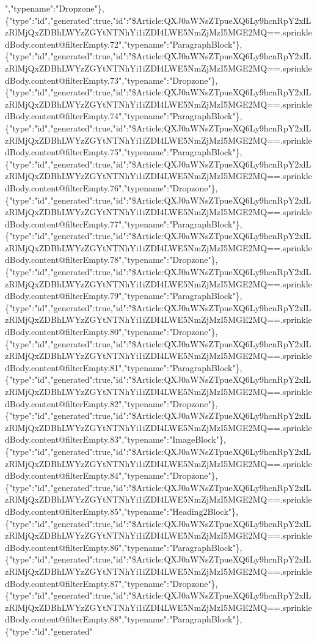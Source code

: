 ","typename":"Dropzone"\},\{"type":"id","generated":true,"id":"\$Article:QXJ0aWNsZTpueXQ6Ly9hcnRpY2xlLzRlMjQxZDBhLWYzZGYtNTNhYi1iZDI4LWE5NmZjMzI5MGE2MQ==.sprinkledBody.content@filterEmpty.72","typename":"ParagraphBlock"\},\{"type":"id","generated":true,"id":"\$Article:QXJ0aWNsZTpueXQ6Ly9hcnRpY2xlLzRlMjQxZDBhLWYzZGYtNTNhYi1iZDI4LWE5NmZjMzI5MGE2MQ==.sprinkledBody.content@filterEmpty.73","typename":"Dropzone"\},\{"type":"id","generated":true,"id":"\$Article:QXJ0aWNsZTpueXQ6Ly9hcnRpY2xlLzRlMjQxZDBhLWYzZGYtNTNhYi1iZDI4LWE5NmZjMzI5MGE2MQ==.sprinkledBody.content@filterEmpty.74","typename":"ParagraphBlock"\},\{"type":"id","generated":true,"id":"\$Article:QXJ0aWNsZTpueXQ6Ly9hcnRpY2xlLzRlMjQxZDBhLWYzZGYtNTNhYi1iZDI4LWE5NmZjMzI5MGE2MQ==.sprinkledBody.content@filterEmpty.75","typename":"ParagraphBlock"\},\{"type":"id","generated":true,"id":"\$Article:QXJ0aWNsZTpueXQ6Ly9hcnRpY2xlLzRlMjQxZDBhLWYzZGYtNTNhYi1iZDI4LWE5NmZjMzI5MGE2MQ==.sprinkledBody.content@filterEmpty.76","typename":"Dropzone"\},\{"type":"id","generated":true,"id":"\$Article:QXJ0aWNsZTpueXQ6Ly9hcnRpY2xlLzRlMjQxZDBhLWYzZGYtNTNhYi1iZDI4LWE5NmZjMzI5MGE2MQ==.sprinkledBody.content@filterEmpty.77","typename":"ParagraphBlock"\},\{"type":"id","generated":true,"id":"\$Article:QXJ0aWNsZTpueXQ6Ly9hcnRpY2xlLzRlMjQxZDBhLWYzZGYtNTNhYi1iZDI4LWE5NmZjMzI5MGE2MQ==.sprinkledBody.content@filterEmpty.78","typename":"Dropzone"\},\{"type":"id","generated":true,"id":"\$Article:QXJ0aWNsZTpueXQ6Ly9hcnRpY2xlLzRlMjQxZDBhLWYzZGYtNTNhYi1iZDI4LWE5NmZjMzI5MGE2MQ==.sprinkledBody.content@filterEmpty.79","typename":"ParagraphBlock"\},\{"type":"id","generated":true,"id":"\$Article:QXJ0aWNsZTpueXQ6Ly9hcnRpY2xlLzRlMjQxZDBhLWYzZGYtNTNhYi1iZDI4LWE5NmZjMzI5MGE2MQ==.sprinkledBody.content@filterEmpty.80","typename":"Dropzone"\},\{"type":"id","generated":true,"id":"\$Article:QXJ0aWNsZTpueXQ6Ly9hcnRpY2xlLzRlMjQxZDBhLWYzZGYtNTNhYi1iZDI4LWE5NmZjMzI5MGE2MQ==.sprinkledBody.content@filterEmpty.81","typename":"ParagraphBlock"\},\{"type":"id","generated":true,"id":"\$Article:QXJ0aWNsZTpueXQ6Ly9hcnRpY2xlLzRlMjQxZDBhLWYzZGYtNTNhYi1iZDI4LWE5NmZjMzI5MGE2MQ==.sprinkledBody.content@filterEmpty.82","typename":"Dropzone"\},\{"type":"id","generated":true,"id":"\$Article:QXJ0aWNsZTpueXQ6Ly9hcnRpY2xlLzRlMjQxZDBhLWYzZGYtNTNhYi1iZDI4LWE5NmZjMzI5MGE2MQ==.sprinkledBody.content@filterEmpty.83","typename":"ImageBlock"\},\{"type":"id","generated":true,"id":"\$Article:QXJ0aWNsZTpueXQ6Ly9hcnRpY2xlLzRlMjQxZDBhLWYzZGYtNTNhYi1iZDI4LWE5NmZjMzI5MGE2MQ==.sprinkledBody.content@filterEmpty.84","typename":"Dropzone"\},\{"type":"id","generated":true,"id":"\$Article:QXJ0aWNsZTpueXQ6Ly9hcnRpY2xlLzRlMjQxZDBhLWYzZGYtNTNhYi1iZDI4LWE5NmZjMzI5MGE2MQ==.sprinkledBody.content@filterEmpty.85","typename":"Heading2Block"\},\{"type":"id","generated":true,"id":"\$Article:QXJ0aWNsZTpueXQ6Ly9hcnRpY2xlLzRlMjQxZDBhLWYzZGYtNTNhYi1iZDI4LWE5NmZjMzI5MGE2MQ==.sprinkledBody.content@filterEmpty.86","typename":"ParagraphBlock"\},\{"type":"id","generated":true,"id":"\$Article:QXJ0aWNsZTpueXQ6Ly9hcnRpY2xlLzRlMjQxZDBhLWYzZGYtNTNhYi1iZDI4LWE5NmZjMzI5MGE2MQ==.sprinkledBody.content@filterEmpty.87","typename":"Dropzone"\},\{"type":"id","generated":true,"id":"\$Article:QXJ0aWNsZTpueXQ6Ly9hcnRpY2xlLzRlMjQxZDBhLWYzZGYtNTNhYi1iZDI4LWE5NmZjMzI5MGE2MQ==.sprinkledBody.content@filterEmpty.88","typename":"ParagraphBlock"\},\{"type":"id","generated"